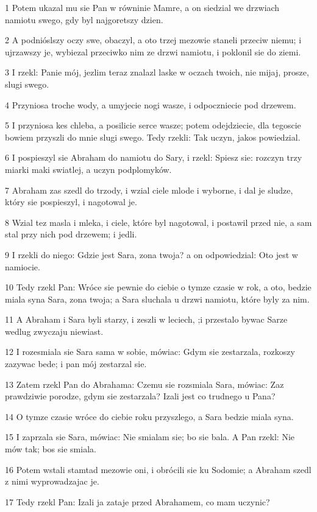 \par 1 Potem ukazal mu sie Pan w równinie Mamre, a on siedzial we drzwiach namiotu swego, gdy byl najgoretszy dzien.
\par 2 A podnióslszy oczy swe, obaczyl, a oto trzej mezowie staneli przeciw niemu; i ujrzawszy je, wybiezal przeciwko nim ze drzwi namiotu, i poklonil sie do ziemi.
\par 3 I rzekl: Panie mój, jezlim teraz znalazl laske w oczach twoich, nie mijaj, prosze, slugi swego.
\par 4 Przyniosa troche wody, a umyjecie nogi wasze, i odpoczniecie pod drzewem.
\par 5 I przyniosa kes chleba, a posilicie serce wasze; potem odejdziecie, dla tegoscie bowiem przyszli do mnie slugi swego. Tedy rzekli: Tak uczyn, jakos powiedzial.
\par 6 I pospieszyl sie Abraham do namiotu do Sary, i rzekl: Spiesz sie: rozczyn trzy miarki maki swiatlej, a uczyn podplomyków.
\par 7 Abraham zas szedl do trzody, i wzial ciele mlode i wyborne, i dal je sludze, który sie pospieszyl, i nagotowal je.
\par 8 Wzial tez masla i mleka, i ciele, które byl nagotowal, i postawil przed nie, a sam stal przy nich pod drzewem; i jedli.
\par 9 I rzekli do niego: Gdzie jest Sara, zona twoja? a on odpowiedzial: Oto jest w namiocie.
\par 10 Tedy rzekl Pan: Wróce sie pewnie do ciebie o tymze czasie w rok, a oto, bedzie miala syna Sara, zona twoja; a Sara sluchala u drzwi namiotu, które byly za nim.
\par 11 A Abraham i Sara byli starzy, i zeszli w leciech, ;i przestalo bywac Sarze wedlug zwyczaju niewiast.
\par 12 I rozesmiala sie Sara sama w sobie, mówiac: Gdym sie zestarzala, rozkoszy zazywac bede; i pan mój zestarzal sie.
\par 13 Zatem rzekl Pan do Abrahama: Czemu sie rozsmiala Sara, mówiac: Zaz prawdziwie porodze, gdym sie zestarzala? Izali jest co trudnego u Pana?
\par 14 O tymze czasie wróce do ciebie roku przyszlego, a Sara bedzie miala syna.
\par 15 I zaprzala sie Sara, mówiac: Nie smialam sie; bo sie bala. A Pan rzekl: Nie mów tak; bos sie smiala.
\par 16 Potem wstali stamtad mezowie oni, i obrócili sie ku Sodomie; a Abraham szedl z nimi wyprowadzajac je.
\par 17 Tedy rzekl Pan: Izali ja zataje przed Abrahamem, co mam uczynic?
